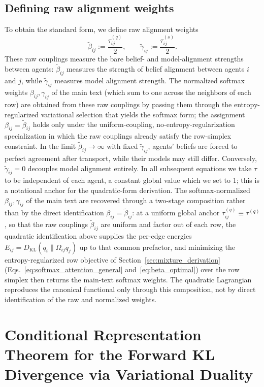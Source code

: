 \documentclass[11pt]{article}
\begin{document}
\subsection{Defining raw alignment weights}
\label{sec:raw_alignment_weights}
To obtain the standard form, we define raw alignment weights
\begin{equation}
\tilde\beta_{ij}:=\frac{\tau^{(q)}_{ij}}{2},
\qquad
\tilde\gamma_{ij}:=\frac{\tau^{(s)}_{ij}}{2}.
\end{equation}
These raw couplings measure the bare belief- and model-alignment strengths between agents: $\tilde\beta_{ij}$ measures the strength of belief alignment between agents $i$ and $j$, while $\tilde\gamma_{ij}$ measures model alignment strength. The normalized softmax weights $\beta_{ij}, \gamma_{ij}$ of the main text (which sum to one across the neighbors of each row) are obtained from these raw couplings by passing them through the entropy-regularized variational selection that yields the softmax form; the assignment $\beta_{ij} = \tilde\beta_{ij}$ holds only under the uniform-coupling, no-entropy-regularization specialization in which the raw couplings already satisfy the row-simplex constraint. In the limit $\tilde\beta_{ij} \to \infty$ with fixed $\tilde\gamma_{ij}$, agents' beliefs are forced to perfect agreement after transport, while their models may still differ. Conversely, $\tilde\gamma_{ij} = 0$ decouples model alignment entirely. In all subsequent equations we take $\tau$ to be independent of each agent, a constant global value which we set to 1; this is a notational anchor for the quadratic-form derivation. The softmax-normalized $\beta_{ij}, \gamma_{ij}$ of the main text are recovered through a two-stage composition rather than by the direct identification $\beta_{ij} = \tilde\beta_{ij}$: at a uniform global anchor $\tau^{(q)}_{ij} \equiv \tau^{(q)}$, so that the raw couplings $\tilde\beta_{ij}$ are uniform and factor out of each row, the quadratic identification above supplies the per-edge energies $E_{ij} = D_{\mathrm{KL}}(q_i \| \Omega_{ij}q_j)$ up to that common prefactor, and minimizing the entropy-regularized row objective of Section~\ref{sec:mixture_derivation} (Eqs.~\eqref{eq:softmax_attention_general} and~\eqref{eq:beta_optimal}) over the row simplex then returns the main-text softmax weights. The quadratic Lagrangian reproduces the canonical functional only through this composition, not by direct identification of the raw and normalized weights.

\section{Conditional Representation Theorem for the Forward KL Divergence via Variational Duality}
\label{app:conditional_representation}
\end{document}
